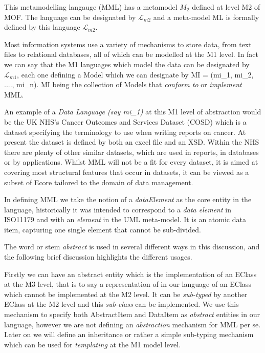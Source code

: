 \documentclass{llncs}
\newcommand{\Lagr}{\mathcal{L}}
\begin{document}
This metamodelling langauge (MML) has a metamodel \textbf{$M_2$} defined at level M2 of MOF. The language can be designated by $\Lagr_{m2}$ and a meta-model ML is formally defined by this language $\Lagr_{m2}$.

Most information systems use a variety of mechanisms to store data, from text files to relational databases, all of which can be modelled at the M1 level.  In fact we can say that the M1 languages which model the data can be designated by $\Lagr_{m1}$, each one defining a Model which we can designate by MI = (mi\_1, mi\_2, ...., mi\_n).  MI being the collection of Models that \emph{conform to} or \emph{implement} MML.  

An example of a \emph{Data Language (say mi\_1)} at this M1 level of abstraction would be the UK NHS's Cancer Outcomes and Services Dataset (COSD) which is a dataset specifying the terminology to use when writing reports on cancer. At present the dataset is defined by both an excel file and an XSD.  Within the NHS there are plenty of other similar datasets, which are used in reports, in databases or by applications.  Whilst MML will not be a fit for every dataset, it is aimed at covering most structural features that occur in datasets, it can be viewed as a subset of Ecore tailored to the domain of data management.

In defining MML we take the notion of a \emph{dataElement} as the core entity in the language, historically it was intended to correspond to a \emph{data element} in ISO11179 and with an \emph{element} in the UML meta-model. It is an atomic data item, capturing one single element that cannot be sub-divided.

The word or stem \emph{abstract} is used in several different ways in this discussion, and the following brief discussion highlights the different usages.  

Firstly we can have an abstract entity which is the implementation of an EClass at the M3 level, that is to say a representation of in our language of an EClass which cannot be implemented at the M2 level. It can be \emph{sub-typed} by another EClass at the M2 level and this \emph{sub-class} can be implemented. We use this mechanism to specify both AbstractItem and DataItem as \emph{abstract} entities in our language, however we are not defining an \emph{abstraction} mechanism for MML per se. Later on we will define an inheritance or rather a simple sub-typing mechanism which can be used for \emph{templating} at the M1 model level. 
\end{document}
